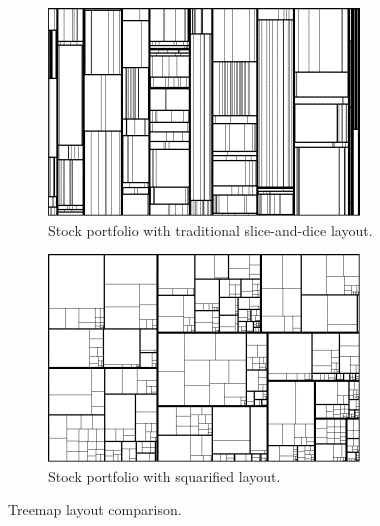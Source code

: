 \begin{figure}[!tbp]
  \begin{subfigure}[b]{0.4\textwidth}
    \includegraphics[width=\textwidth]{figures/comp_treemap1.png}
    \caption{Stock portfolio with traditional slice-and-dice layout.}
    \label{fig:comp_treemap1}
  \end{subfigure}
  \hfill
  \begin{subfigure}[b]{0.4\textwidth}
    \includegraphics[width=\textwidth]{figures/comp_treemap2.png}
    \caption{Stock portfolio with squarified layout.}
    \label{fig:comp_treemap2}
  \end{subfigure}
  \caption{Treemap layout comparison.}
\end{figure}

